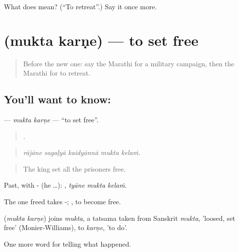 \begin{tcolorbox}[breakable,colback=teal!4,colframe=teal!35!black,title={Before you move on}]
What does   mean? (\textquotedblleft{}To retreat\textquotedblright{}.) Say it once more.
\end{tcolorbox}
\section[\texorpdfstring{\mr{मुक्त} \mr{करणे} (mukta karṇe)}{मुक्त करणे (mukta karṇe)}]{  (mukta karṇe) — to set free}

\label{lesson:MR-C333-mukta-karne}



\begin{quote}
Before the new one: say the Marathi for a military campaign, then the Marathi for to retreat.
\end{quote}

\subsection*{You'll want to know:  }
\textbf{ } — \emph{mukta karṇe} — \textquotedblleft{}to set free\textquotedblright{}.

\begin{quote}
    .
\end{quote}

\begin{quote}
\emph{rājāne sagaḷyā kaidyānnā mukta kelaṁ.}
\end{quote}

\begin{quote}
The king set all the prisoners free.
\end{quote}

Past, with - (he …):   , \emph{tyāne mukta kelaṁ}.

The one freed takes -;  , to become free.

\begin{cousinweb}
\textbf{ } (\emph{mukta karṇe}) joins \emph{mukta}, a tatsama taken from Sanskrit \emph{mukta}, 'loosed, set free' (Monier-Williams), to \emph{karṇe}, 'to do'.
\end{cousinweb}

\begin{grammarlens}[title={What you've built}]
One more word for telling what happened.
\end{grammarlens}

